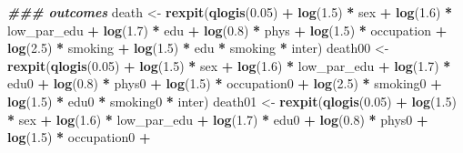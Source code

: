\documentclass[
]{book}
\newenvironment{Shaded}{\begin{snugshade}}{\end{snugshade}}
\newcommand{\DocumentationTok}[1]{\textcolor[rgb]{0.56,0.35,0.01}{\textbf{\textit{#1}}}}
\newcommand{\FloatTok}[1]{\textcolor[rgb]{0.00,0.00,0.81}{#1}}
\newcommand{\FunctionTok}[1]{\textcolor[rgb]{0.13,0.29,0.53}{\textbf{#1}}}
\newcommand{\NormalTok}[1]{#1}
\newcommand{\OtherTok}[1]{\textcolor[rgb]{0.56,0.35,0.01}{#1}}
\newcommand{\SpecialCharTok}[1]{\textcolor[rgb]{0.81,0.36,0.00}{\textbf{#1}}}
\begin{document}
\begin{Shaded}
\begin{Highlighting}[]
  
  \DocumentationTok{\#\#\# outcomes}
\NormalTok{  death }\OtherTok{\textless{}{-}} \FunctionTok{rexpit}\NormalTok{(}\FunctionTok{qlogis}\NormalTok{(}\FloatTok{0.05}\NormalTok{) }\SpecialCharTok{+} \FunctionTok{log}\NormalTok{(}\FloatTok{1.5}\NormalTok{) }\SpecialCharTok{*}\NormalTok{ sex  }\SpecialCharTok{+} \FunctionTok{log}\NormalTok{(}\FloatTok{1.6}\NormalTok{) }\SpecialCharTok{*}\NormalTok{ low\_par\_edu }\SpecialCharTok{+} 
                    \FunctionTok{log}\NormalTok{(}\FloatTok{1.7}\NormalTok{) }\SpecialCharTok{*}\NormalTok{ edu }\SpecialCharTok{+} \FunctionTok{log}\NormalTok{(}\FloatTok{0.8}\NormalTok{) }\SpecialCharTok{*}\NormalTok{ phys }\SpecialCharTok{+} \FunctionTok{log}\NormalTok{(}\FloatTok{1.5}\NormalTok{) }\SpecialCharTok{*}\NormalTok{ occupation }\SpecialCharTok{+} 
                    \FunctionTok{log}\NormalTok{(}\FloatTok{2.5}\NormalTok{) }\SpecialCharTok{*}\NormalTok{ smoking }\SpecialCharTok{+} \FunctionTok{log}\NormalTok{(}\FloatTok{1.5}\NormalTok{) }\SpecialCharTok{*}\NormalTok{ edu }\SpecialCharTok{*}\NormalTok{ smoking }\SpecialCharTok{*}\NormalTok{ inter)}
\NormalTok{  death00 }\OtherTok{\textless{}{-}} \FunctionTok{rexpit}\NormalTok{(}\FunctionTok{qlogis}\NormalTok{(}\FloatTok{0.05}\NormalTok{) }\SpecialCharTok{+} \FunctionTok{log}\NormalTok{(}\FloatTok{1.5}\NormalTok{) }\SpecialCharTok{*}\NormalTok{ sex  }\SpecialCharTok{+} \FunctionTok{log}\NormalTok{(}\FloatTok{1.6}\NormalTok{) }\SpecialCharTok{*}\NormalTok{ low\_par\_edu }\SpecialCharTok{+} 
                      \FunctionTok{log}\NormalTok{(}\FloatTok{1.7}\NormalTok{) }\SpecialCharTok{*}\NormalTok{ edu0 }\SpecialCharTok{+} \FunctionTok{log}\NormalTok{(}\FloatTok{0.8}\NormalTok{) }\SpecialCharTok{*}\NormalTok{ phys0 }\SpecialCharTok{+} \FunctionTok{log}\NormalTok{(}\FloatTok{1.5}\NormalTok{) }\SpecialCharTok{*}\NormalTok{ occupation0 }\SpecialCharTok{+} 
                      \FunctionTok{log}\NormalTok{(}\FloatTok{2.5}\NormalTok{) }\SpecialCharTok{*}\NormalTok{ smoking0 }\SpecialCharTok{+} \FunctionTok{log}\NormalTok{(}\FloatTok{1.5}\NormalTok{) }\SpecialCharTok{*}\NormalTok{ edu0 }\SpecialCharTok{*}\NormalTok{ smoking0 }\SpecialCharTok{*}\NormalTok{ inter)}
\NormalTok{  death01 }\OtherTok{\textless{}{-}} \FunctionTok{rexpit}\NormalTok{(}\FunctionTok{qlogis}\NormalTok{(}\FloatTok{0.05}\NormalTok{) }\SpecialCharTok{+} \FunctionTok{log}\NormalTok{(}\FloatTok{1.5}\NormalTok{) }\SpecialCharTok{*}\NormalTok{ sex  }\SpecialCharTok{+} \FunctionTok{log}\NormalTok{(}\FloatTok{1.6}\NormalTok{) }\SpecialCharTok{*}\NormalTok{ low\_par\_edu }\SpecialCharTok{+} 
                      \FunctionTok{log}\NormalTok{(}\FloatTok{1.7}\NormalTok{) }\SpecialCharTok{*}\NormalTok{ edu0 }\SpecialCharTok{+} \FunctionTok{log}\NormalTok{(}\FloatTok{0.8}\NormalTok{) }\SpecialCharTok{*}\NormalTok{ phys0 }\SpecialCharTok{+} \FunctionTok{log}\NormalTok{(}\FloatTok{1.5}\NormalTok{) }\SpecialCharTok{*}\NormalTok{ occupation0 }\SpecialCharTok{+} 

\end{Highlighting}
\end{Shaded}
\end{document}
